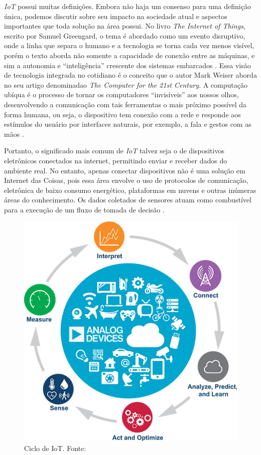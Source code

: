 \textit{IoT} possui muitas definições. Embora não haja um consenso para uma definição única, podemos discutir sobre seu impacto na sociedade atual e aspectos importantes que toda solução na área possui. No livro \textit{The Internet  of Things}, escrito por 
Samuel Greengard, o tema é abordado como um evento disruptivo, onde a linha que separa o humano e a tecnologia se torna cada vez menos visível, porém o texto aborda não somente a capacidade de conexão entre as máquinas, e sim a autonomia 
e ``inteligência'' crescente dos sistemas embarcados \cite[pp. 17]{book-iot}. Essa visão de tecnologia integrada no cotidiano é o conceito que o autor Mark Weiser aborda no seu artigo denominadao \textit{The Computer for the 21st Century}. A computação ubíqua 
é o processo de tornar os computadores ``invisíveis'' aos nossos olhos, desenvolvendo a comunicação com tais ferramentas o mais próximo possível da forma humana, ou seja, o dispositivo tem conexão com a rede e responde aos estímulos do usuário por 
interfaces naturais, por exemplo, a fala e gestos com as mãos \cite{ubiquitous-computing}.

Portanto, o significado mais comum de \textit{IoT} talvez seja o de dispositivos eletrônicos conectados na internet, permitindo 
enviar e receber dados do ambiente real. No entanto, apenas conectar dispositivos não é uma solução em Internet das Coisas, pois essa 
área envolve o uso de protocolos de comunicação, eletrônica de baixo consumo energético, plataformas em nuvens e outras inúmeras 
áreas do conhecimento. Os dados coletados de sensores atuam como combustível para a execução de um fluxo de tomada de decisão \cite{iot-cycle}. 

\begin{figure}[ht]
    \centering
    \includegraphics[width=.45\textwidth]{img/iot-cycle.png}
    \caption{Ciclo de IoT. Fonte:\cite{iot-cycle}}\label{figIoTCycle}
\end{figure}

